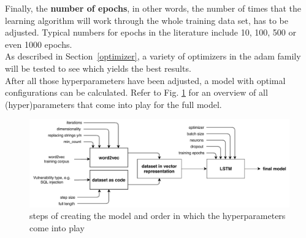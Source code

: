 \documentclass[
a4paper,
pagesize,
pdftex,
12pt,
twoside, %
BCOR=5mm, %
ngerman,
fleqn,
final,
]{scrartcl}
\begin{document}
	Finally, the \textbf{number of epochs}, in other words, the number of times that the learning algorithm will work through the whole training data set, has to be adjusted. Typical numbers for epochs in the literature include 10, 100, 500 or even 1000 epochs.\\
	As described in Section~\ref{optimizer}, a variety of optimizers in the adam family will be tested to see which yields the best results.\\
	After all those hyperparameters have been adjusted, a model with optimal configurations can be calculated. Refer to Fig. \ref{fig:parameters} for an overview of all (hyper)parameters that come into play for the full model.
	
	\begin{figure}[h]
		\centering
		\includegraphics[width=\linewidth]{img/Parameters}
		\caption{steps of creating the model and order in which the hyperparameters come into play}
		\label{fig:parameters}
	\end{figure}
	
\end{document}
